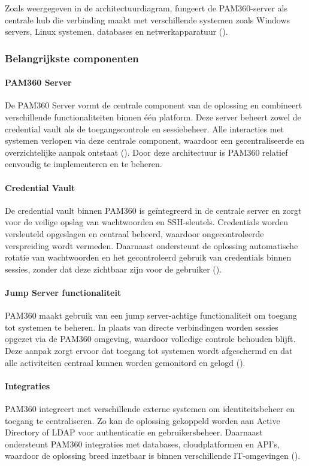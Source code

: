 Zoals weergegeven in de architectuurdiagram, fungeert de PAM360-server als centrale hub die verbinding maakt met verschillende systemen zoals Windows servers, Linux systemen, databases en netwerkapparatuur (\cite{pam360_architecture}).

\subsubsection{Belangrijkste componenten}
\paragraph{PAM360 Server}
De PAM360 Server vormt de centrale component van de oplossing en combineert verschillende functionaliteiten binnen één platform. Deze server beheert zowel de credential vault als de toegangscontrole en sessiebeheer. Alle interacties met systemen verlopen via deze centrale component, waardoor een gecentraliseerde en overzichtelijke aanpak ontstaat (\cite{pam360_architecture}). Door deze architectuur is PAM360 relatief eenvoudig te implementeren en te beheren.
\paragraph{Credential Vault}
De credential vault binnen PAM360 is geïntegreerd in de centrale server en zorgt voor de veilige opslag van wachtwoorden en SSH-sleutels. Credentials worden versleuteld opgeslagen en centraal beheerd, waardoor ongecontroleerde verspreiding wordt vermeden. Daarnaast ondersteunt de oplossing automatische rotatie van wachtwoorden en het gecontroleerd gebruik van credentials binnen sessies, zonder dat deze zichtbaar zijn voor de gebruiker (\cite{pam360_architecture}).
\paragraph{Jump Server functionaliteit}
PAM360 maakt gebruik van een jump server-achtige functionaliteit om toegang tot systemen te beheren. In plaats van directe verbindingen worden sessies opgezet via de PAM360 omgeving, waardoor volledige controle behouden blijft. Deze aanpak zorgt ervoor dat toegang tot systemen wordt afgeschermd en dat alle activiteiten centraal kunnen worden gemonitord en gelogd (\cite{pam360_architecture}).
\paragraph{Integraties}
PAM360 integreert met verschillende externe systemen om identiteitsbeheer en toegang te centraliseren. Zo kan de oplossing gekoppeld worden aan Active Directory of LDAP voor authenticatie en gebruikersbeheer. Daarnaast ondersteunt PAM360 integraties met databases, cloudplatformen en API’s, waardoor de oplossing breed inzetbaar is binnen verschillende IT-omgevingen (\cite{pam360_architecture}).
